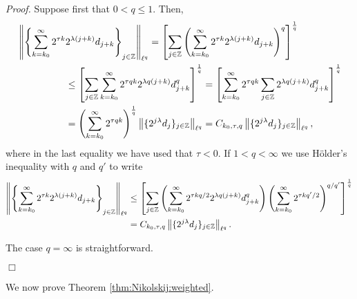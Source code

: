\noindent \textit{Proof.} Suppose first that $0 < q \leq 1$. Then,
\begin{align*}
& \left\|\left\{\sum_{k=k_0}^\infty 2^{\tau k} 2^{\lambda(j+k)}d_{j+k}\right\}_{j\in \mathbb{Z}}\right\|_{\ell^q} = \left[\sum_{j \in \mathbb{Z}} \left( \sum_{k=k_0}^\infty 2^{\tau k} 2^{\lambda(j+k)}d_{j+k} \right)^q \right]^\frac{1}{q}\\
& \quad\quad\quad\quad\quad \leq  \left[\sum_{j \in \mathbb{Z}}  \sum_{k=k_0}^\infty 2^{\tau q k} 2^{\lambda q (j+k)}d_{j+k}^q \right]^\frac{1}{q} =  \left[ \sum_{k=k_0}^\infty  2^{\tau q k} \sum_{j \in \mathbb{Z}} 2^{\lambda q (j+k)}d_{j+k}^q \right]^\frac{1}{q}\\
&  \quad\quad\quad \quad \quad = \left(  \sum_{k=k_0}^\infty   2^{\tau q k}     \right)^\frac{1}{q} \left\|\{2^{j \lambda} d_j\}_{j\in \mathbb{Z}}\right\|_{\ell^q} = C_{k_0, \tau, q} \left\|\{2^{j \lambda} d_j\}_{j\in\mathbb{Z}}\right\|_{\ell^q},
\end{align*}
where in the last equality we have used that $\tau < 0$. If $1 < q < \infty$ we use H\"older's inequality with $q$ and $q'$ to write
\begin{align*}
 \left\|\left\{\sum_{k=k_0}^\infty 2^{\tau k} 2^{\lambda(j+k)}d_{j+k}\right\}_{j\in\mathbb{Z}}\right\|_{\ell^q} 
& \le \left[\sum_{j \in \mathbb{Z}}   \left(\sum_{k=k_0}^\infty 2^{\tau k q/2} 2^{\lambda q(j+k)}d_{j+k}^q \right)     \left( \sum_{k=k_0}^\infty 2^{\tau kq'/2} \right)^{q/q'}   \right]^\frac{1}{q}\\
&    =C_{k_0, \tau, q} \left\|\{2^{j \lambda} d_j\}_{j\in\mathbb{Z}}\right\|_{\ell^q}.
\end{align*}

The case $q = \infty$ is straightforward. \begin{flushright}
$\Box$
\end{flushright}


We now prove Theorem \ref{thm:Nikolskij:weighted}.


